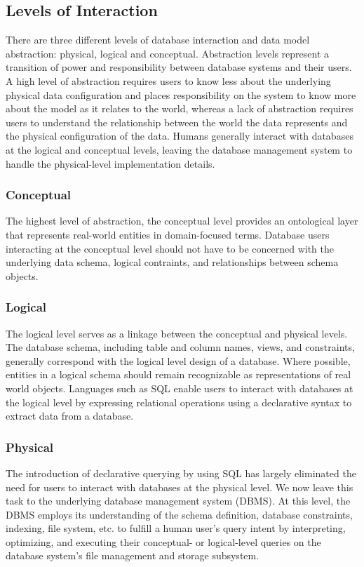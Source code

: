 \subsection{Levels of Interaction}

There are three different levels of database interaction and data model abstraction: physical, logical and conceptual. Abstraction levels represent a transition of power and responsibility between database systems and their users. A high level of abstraction requires users to know less about the underlying physical data configuration and places responsibility on the system to know more about the model as it relates to the world, whereas a lack of abstraction requires users to understand the relationship between the world the data represents and the physical configuration of the data. \cite{10.2307/249587, 1268162} Humans generally interact with databases at the logical and conceptual levels, leaving the database management system to handle the physical-level implementation details.

\subsubsection{Conceptual} The highest level of abstraction, the conceptual level provides an ontological layer that represents real-world entities in domain-focused terms. 
Database users interacting at the conceptual level should not have to be concerned with the underlying data schema, logical contraints, and relationships between schema objects.

\subsubsection{Logical} The logical level serves as a linkage between the conceptual and physical levels. The database schema, including table and column names, views, and constraints, generally correspond with the logical level design of a database. Where possible, entities in a logical schema should remain recognizable as representations of real world objects. Languages such as SQL enable users to interact with databases at the logical level by expressing relational operations using a declarative syntax to extract data from a database.

\subsubsection{Physical} The introduction of declarative querying by using SQL has largely eliminated the need for users to interact with databases at the physical level. We now leave this task to the underlying database management system (DBMS). 
At this level, the DBMS employs its understanding of the schema definition, database constraints, indexing, file system, etc. to fulfill a human user's query intent by interpreting, optimizing, and executing their conceptual- or logical-level queries on the database system's file management and storage subsystem.


